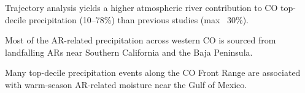 \documentclass[draft]{agujournal2019}
\begin{document}






\begin{keypoints}
\item Trajectory analysis yields a higher atmospheric river contribution to CO top-decile precipitation (10–78\%) than previous studies (max ~30\%).
\item Most of the AR-related precipitation across western CO is sourced from landfalling ARs near Southern California and the Baja Peninsula.
\item Many top-decile precipitation events along the CO Front Range are associated with warm-season AR-related moisture near the Gulf of Mexico.
\end{keypoints}

%
%

%
%
\end{document}
